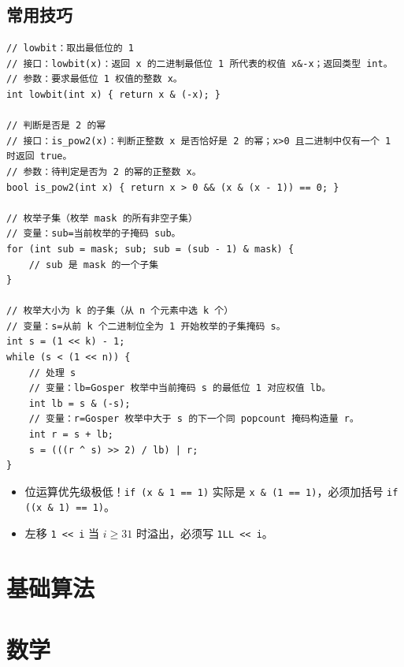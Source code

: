 \documentclass[UTF8,openany,oneside,zihao=-4]{ctexbook}
\newcommand{\inputnewboard}[1]{%
  {%
    \lstset{basicstyle=\newboardcodefont\small}%
  }%
}
\begin{document}
\section{常用技巧}

\begin{lstlisting}
// lowbit：取出最低位的 1
// 接口：lowbit(x)：返回 x 的二进制最低位 1 所代表的权值 x&-x；返回类型 int。
// 参数：要求最低位 1 权值的整数 x。
int lowbit(int x) { return x & (-x); }

// 判断是否是 2 的幂
// 接口：is_pow2(x)：判断正整数 x 是否恰好是 2 的幂；x>0 且二进制中仅有一个 1 时返回 true。
// 参数：待判定是否为 2 的幂的正整数 x。
bool is_pow2(int x) { return x > 0 && (x & (x - 1)) == 0; }

// 枚举子集（枚举 mask 的所有非空子集）
// 变量：sub=当前枚举的子掩码 sub。
for (int sub = mask; sub; sub = (sub - 1) & mask) {
    // sub 是 mask 的一个子集
}

// 枚举大小为 k 的子集（从 n 个元素中选 k 个）
// 变量：s=从前 k 个二进制位全为 1 开始枚举的子集掩码 s。
int s = (1 << k) - 1;
while (s < (1 << n)) {
    // 处理 s
    // 变量：lb=Gosper 枚举中当前掩码 s 的最低位 1 对应权值 lb。
    int lb = s & (-s);
    // 变量：r=Gosper 枚举中大于 s 的下一个同 popcount 掩码构造量 r。
    int r = s + lb;
    s = (((r ^ s) >> 2) / lb) | r;
}
\end{lstlisting}

\begin{warn}
\begin{itemize}
  \item 位运算优先级极低！\lstinline|if (x & 1 == 1)| 实际是 \lstinline|x & (1 == 1)|，必须加括号 \lstinline|if ((x & 1) == 1)|。
  \item 左移 \lstinline|1 << i| 当 $i \ge 31$ 时溢出，必须写 \lstinline|1LL << i|。
\end{itemize}
\end{warn}

\inputnewboard{remake/large/01_位运算.tex}
\inputnewboard{remake/large/01_线性基_详解.tex}


\chapter{基础算法}
\inputnewboard{remake/large/02_基础.tex}

\chapter{数学}
\inputnewboard{remake/large/03_数学.tex}
\inputnewboard{remake/large/03_高精度.tex}
\inputnewboard{remake/large/03_数学_详解.tex}
\end{document}
